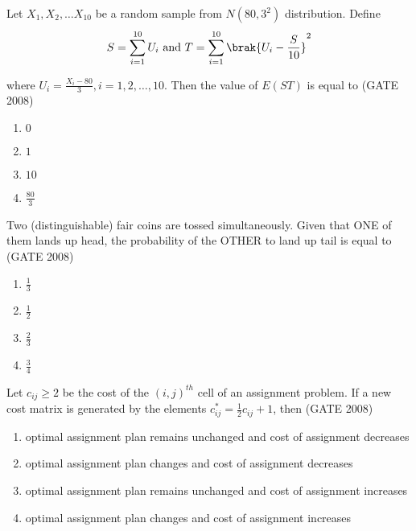 \item{ Let $X_1, X_2, \ldots X_{10}$ be a random sample from $N(80,3^2)$ distribution. Define 
$$S=\sum_{i=1}^{10}U_i \text{ and } T=\sum_{i=1}^{10}\brak{U_i - \frac{S}{10}}^2$$

where $U_i = \frac{X_i - 80}{3}, i=1,2,\ldots,10$. Then the value of $E(ST)$ is equal to \hfill (GATE 2008)
\begin{multicols}{4}
    \begin{enumerate}
        \item $0$
        \item $1$
        \item $10$
        \item $\frac{80}{3}$
    \end{enumerate}
\end{multicols}
}

\item{ Two (distinguishable) fair coins are tossed simultaneously. Given that ONE of them lands up head, the probability of the OTHER to land up tail is equal to \hfill (GATE 2008)
\begin{multicols}{4}
    \begin{enumerate}
        \item $\frac{1}{3}$
        \item $\frac{1}{2}$
        \item $\frac{2}{3}$
        \item $\frac{3}{4}$
    \end{enumerate}
\end{multicols}
}

\item{ Let $c_{ij}\geq2$ be the cost of the $(i, j)^{th}$ cell of an assignment problem. If a new cost matrix is generated by the elements $c_{ij}^*= \frac{1}{2} c_{ij} +1$, then \hfill (GATE 2008)

\begin{enumerate}
    \item optimal assignment plan remains unchanged and cost of assignment decreases 
    \item optimal assignment plan changes and cost of assignment decreases
    \item optimal assignment plan remains unchanged and cost of assignment increases 
    \item optimal assignment plan changes and cost of assignment increases
\end{enumerate}
}
